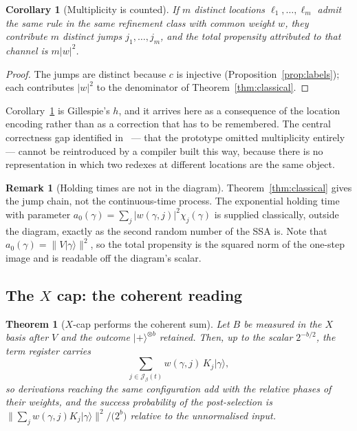 \documentclass[11pt]{article}
\theoremstyle{definition}
\newtheorem{remark}[definition]{Remark}
\theoremstyle{plain}
\newtheorem{theorem}[definition]{Theorem}
\newtheorem{corollary}[definition]{Corollary}
\newcommand{\Jumps}{\mathcal{J}}
\newcommand{\ket}[1]{| #1 \rangle}
\begin{document}
\begin{corollary}[Multiplicity is counted]\label{cor:multiplicity}
If $m$ distinct locations $\ell_1,\dots,\ell_m$ admit the same rule in the same refinement class
with common weight $w$, they contribute $m$ distinct jumps $j_1,\dots,j_m$, and the total
propensity attributed to that channel is $m|w|^2$.
\end{corollary}

\begin{proof}
The jumps are distinct because $c$ is injective (Proposition~\ref{prop:labels}); each contributes
$|w|^2$ to the denominator of Theorem~\ref{thm:classical}.
\end{proof}

Corollary~\ref{cor:multiplicity} is Gillespie's $h$, and it arrives here as a consequence of the
location encoding rather than as a correction that has to be remembered. The central correctness
gap identified in~\cite[\S9.2]{weighted} --- that the prototype omitted multiplicity entirely ---
cannot be reintroduced by a compiler built this way, because there is no representation in which
two redexes at different locations are the same object.

\begin{remark}[Holding times are not in the diagram]\label{rem:holding}
Theorem~\ref{thm:classical} gives the jump chain, not the continuous-time process. The
exponential holding time with parameter $a_0(\gamma) = \sum_j |w(\gamma,j)|^2\chi_j(\gamma)$ is
supplied classically, outside the diagram, exactly as the second random number of the SSA is.
Note that $a_0(\gamma) = \|V\ket{\gamma}\|^2$, so the total propensity is the squared norm of
the one-step image and is readable off the diagram's scalar.
\end{remark}

\subsection{The \texorpdfstring{$X$}{X} cap: the coherent reading}

\begin{theorem}[$X$-cap performs the coherent sum]\label{thm:coherent}
Let $B$ be measured in the $X$ basis after $V$ and the outcome $\ket{+}^{\otimes b}$ retained.
Then, up to the scalar $2^{-b/2}$, the term register carries
\[
  \sum_{j\in\Jumps_\beta(t)} w(\gamma,j)\,K_j\ket{\gamma},
\]
so derivations reaching the same configuration add with the relative phases of their weights,
and the success probability of the post-selection is
$\bigl\|\sum_j w(\gamma,j)K_j\ket{\gamma}\bigr\|^2 / \bigl(2^{b}\bigr)$ relative to the
unnormalised input.
\end{theorem}
\end{document}
